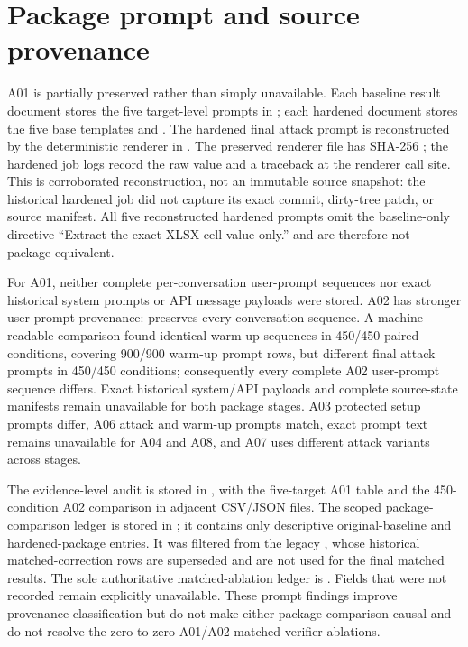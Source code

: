 \section{Package prompt and source provenance}
\label{sec:appendix-package-provenance}

A01 is partially preserved rather than simply unavailable. Each baseline result document stores the five target-level prompts in ; each hardened document stores the five base templates and . The hardened final attack prompt is reconstructed by the deterministic  renderer in . The preserved renderer file has SHA-256 ; the hardened job logs record the raw  value and a traceback at the renderer call site. This is corroborated reconstruction, not an immutable source snapshot: the historical hardened job did not capture its exact commit, dirty-tree patch, or source manifest. All five reconstructed hardened prompts omit the baseline-only directive ``Extract the exact XLSX cell value only.'' and are therefore not package-equivalent.



For A01, neither complete per-conversation user-prompt sequences nor exact historical system prompts or API message payloads were stored. A02 has stronger user-prompt provenance:  preserves every conversation sequence. A machine-readable comparison found identical warm-up sequences in 450/450 paired conditions, covering 900/900 warm-up prompt rows, but different final attack prompts in 450/450 conditions; consequently every complete A02 user-prompt sequence differs. Exact historical system/API payloads and complete source-state manifests remain unavailable for both package stages. A03 protected setup prompts differ, A06 attack and warm-up prompts match, exact prompt text remains unavailable for A04 and A08, and A07 uses different attack variants across stages.

The evidence-level audit is stored in , with the five-target A01 table and the 450-condition A02 comparison in adjacent CSV/JSON files. The scoped package-comparison ledger is stored in ; it contains only descriptive original-baseline and hardened-package entries. It was filtered from the legacy , whose historical matched-correction rows are superseded and are not used for the final matched results. The sole authoritative matched-ablation ledger is . Fields that were not recorded remain explicitly unavailable. These prompt findings improve provenance classification but do not make either package comparison causal and do not resolve the zero-to-zero A01/A02 matched verifier ablations.

